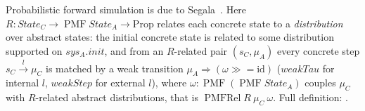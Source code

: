 \begin{definition}
  \label{def:forwardsim}
  \leanok
  Probabilistic forward simulation is due to Segala~\cite{Segala95}.
  Here $R : State_C \to \operatorname{PMF} State_A \to \mathrm{Prop}$ relates each concrete state to a \emph{distribution} over abstract states: the initial concrete state is related to some distribution supported on $sys_A.init$, and from an $R$-related pair $(s_C, \mu_A)$ every concrete step $s_C \xrightarrow{l} \mu_C$ is matched by a weak transition $\mu_A \Rightarrow (\omega \mathbin{\gg\!=}\mathrm{id})$ ($weakTau$ for internal $l$, $weakStep$ for external $l$), where $\omega : \operatorname{PMF}(\operatorname{PMF} State_A)$ couples $\mu_C$ with $R$-related abstract distributions, that is $\operatorname{PMFRel} R\ \mu_C\ \omega$.
  Full definition: .
\end{definition}
